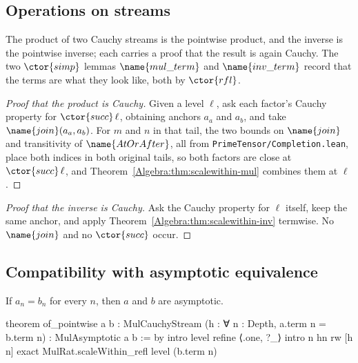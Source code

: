 \subsection{Operations on streams}

\begin{definition}
\label{Algebra:def:stream-ops}
The product of two Cauchy streams is the pointwise product, and the inverse is
the pointwise inverse; each carries a proof that the result is again Cauchy.
The two $\ctor{simp}$ lemmas $\name{mul\_term}$ and $\name{inv\_term}$ record
that the terms are what they look like, both by $\ctor{rfl}$.
\end{definition}

\begin{proof}[Proof that the product is Cauchy]
Given a level $\ell$, ask each factor's Cauchy property for
$\ctor{succ}\,\ell$, obtaining anchors $a_a$ and $a_b$, and take
$\name{join}(a_a, a_b)$.  For $m$ and $n$ in that tail, the two bounds on
$\name{join}$ and transitivity of $\name{AtOrAfter}$, all from
\texttt{PrimeTensor/Completion.lean}, place both indices in both original
tails, so both factors are close at $\ctor{succ}\,\ell$, and
Theorem~\ref{Algebra:thm:scalewithin-mul} combines them at $\ell$.
\end{proof}

\begin{proof}[Proof that the inverse is Cauchy]
Ask the Cauchy property for $\ell$ itself, keep the same anchor, and apply
Theorem~\ref{Algebra:thm:scalewithin-inv} termwise.  No $\name{join}$ and no
$\ctor{succ}$ occur.
\end{proof}

\subsection{Compatibility with asymptotic equivalence}

\begin{lemma}\label{Algebra:lem:of-pointwise}
If $a_n = b_n$ for every $n$, then $a$ and $b$ are asymptotic.
\end{lemma}

\begin{leancode}
theorem of_pointwise {a b : MulCauchyStream}
    (h : ∀ n : Depth, a.term n = b.term n) :
    MulAsymptotic a b := by
  intro level
  refine ⟨.one, ?_⟩
  intro n hn
  rw [h n]
  exact MulRat.scaleWithin_refl level (b.term n)
\end{leancode}

